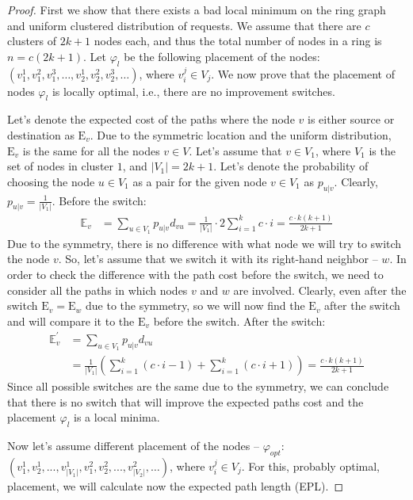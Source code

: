 \documentclass[conference]{IEEEtran}
\def\E{\mathbb{E}}
\begin{document}
\begin{proof}
First we show that there exists a bad local minimum on the ring graph and uniform clustered distribution of requests. We assume that there are $c$ clusters of $2k+1$ nodes each, and thus the total number of nodes in a ring is $n=c(2k+1)$. Let $\varphi_l$ be the following placement of the nodes: $(v_1^1,v_1^2,v_1^3,\ldots,v_2^1,v_2^2,v_2^3,\ldots)$, where $v_i^j\in V_j$.
We now prove that
the placement of nodes $\varphi_l$ is locally optimal, i.e., there are no improvement switches.

Let's denote the expected cost of the paths where the node $v$ is either source or destination as $\text{E}_v$. Due to the symmetric location and the uniform distribution, $\text{E}_v$ is the same for all the nodes $v\in V$.  
Let's assume that $v\in V_1$, where $V_1$ is the set of nodes in cluster $1$, and $\left| V_1\right |=2k+1$. Let's denote the probability of choosing the node $u\in{V_1}$ as a pair for the given node $v\in{V_1}$ as $p_{u|v}$. Clearly, $p_{u|v}=\frac{1}{|V_1|}$. 
Before the switch:
\begin{align*}
\E_v&=\sum_{u\in V_1}p_{u|v}d_{vu}= \frac{1}{\left| V_1\right |}\cdot 2\sum_{i=1}^k c\cdot i =\frac{c\cdot k(k+1)}{2k+1} 
\end{align*}
Due to the symmetry, there is no difference with what node we will try to switch the node $v$. So, let's assume that we switch it with its right-hand neighbor -- $w$. In order to check the difference with the path cost before the switch, we need to consider all the paths in which nodes $v$ and $w$ are involved. Clearly, even after the switch $\text{E}_v=\text{E}_w$ due to the symmetry, so we will now find the $\text{E}_v$ after the switch and will compare it to the $\text{E}_v$ before the switch.
After the switch:
\begin{align*}
\E_v^{'}&=\sum_{u\in V_1}p_{u|v}d_{vu}\\
&= \frac{1}{\left| V_1\right |}\left(\sum_{i=1}^k (c\cdot i-1)+\sum_{i=1}^k (c\cdot i+1)\right)=\frac{c\cdot k(k+1)}{2k+1} 
\end{align*}
Since all possible switches are the same due to the symmetry, we can conclude that there is no switch that will improve the expected paths cost and the placement $\varphi_l$ is a local minima.

Now let's assume different placement of the nodes -- $\varphi_{opt}$:  $(v_1^1,v_2^1,...,v_{\left | V_1 \right |}^1,v_1^2,v_2^2,...,v_{\left | V_2 \right |}^2,\ldots)$, where $v_i^j\in V_j$.
For this, probably optimal, placement, we will calculate now the expected path length (EPL).


\end{proof}
\end{document}
